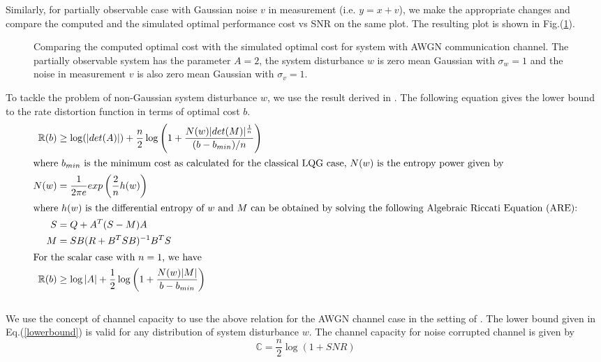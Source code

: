 \documentclass[12pt]{caltech_thesis_progress2}
\begin{document}
Similarly, for partially observable case with Gaussian noise $v$ in measurement (i.e. $y = x + v$), we make the appropriate changes and compare the computed and the simulated optimal performance cost vs SNR on the same plot. The resulting plot is shown in Fig.(\ref{comp_vs_sim_v}).
	\begin{figure}[H]
			  \centering
			\tiny{	
			}
			  \caption{Comparing the computed optimal cost with the simulated optimal cost for system with AWGN communication channel. The partially observable system has the parameter $A = 2$, the system disturbance $w$ is zero mean Gaussian with $\sigma_{w} = 1$ and the noise in measurement $v$ is also zero mean Gaussian with $\sigma_{v} = 1$.}
			 \label{comp_vs_sim_v}
		\end{figure}	
		To tackle the problem of non-Gaussian system disturbance $w$, we use the result derived in \cite{victoria}. The following equation gives the lower bound to the rate distortion function in terms of optimal cost $b$. 
	\begin{align}
	\label{lowerbound}
	\mathbb{R}(b) &\geq \log(|det(A)|) + \frac{n}{2} \log \left( 1 + \frac{N(w)|det(M)|^{\frac{1}{n}}}{(b-b_{min})/n}\right) \\	
	\intertext{where $b_{min}$ is the minimum cost as calculated for the classical LQG case, $N(w)$ is the entropy power given by}	
	N(w) &= \frac{1}{2 \pi e} exp \left( \frac{2}{n} h(w) \right)\\	
	\intertext{where $h(w)$ is the differential entropy of $w$ and $M$ can be obtained by solving the following Algebraic Riccati Equation (ARE):}
	S &= Q + A^{T}(S - M)A\\
	M &= SB(R + B^{T}SB)^{-1}B^{T}S\\
	\intertext{For the scalar case with $n = 1$, we have}
	\mathbb{R}(b) &\geq \log|A| + \frac{1}{2} \log \left( 1 + \frac{N(w)|M|}{b-b_{min}}\right)
	\end{align}\\		
	We use the concept of channel capacity to use the above relation for the AWGN channel case in the setting of \cite{anatoly}. The lower bound given in Eq.(\ref{lowerbound}) is valid for any distribution of system disturbance $w$. The channel capacity for noise corrupted channel is given by
	\begin{equation}
		\mathbb{C} = \frac{n}{2} \log\left( 1 + SNR \right)
	\end{equation}
\end{document}
